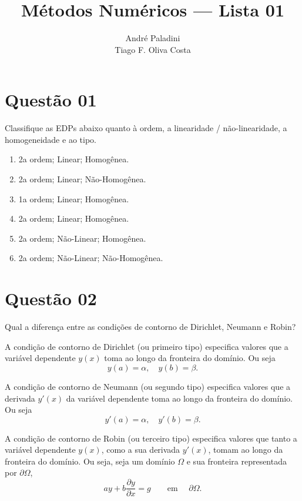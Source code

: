 \documentclass{article}
\title{Métodos Numéricos --- Lista 01}
\author{André Paladini  \quad 14182390 \\ Tiago F. Oliva Costa \quad 8004408 }
\begin{document}
\maketitle

\section{Questão 01}
Classifique as EDPs abaixo quanto à ordem, a linearidade / não-linearidade, a homogeneidade e ao tipo.

\begin{enumerate}[label=\Alph*]
\item 2a ordem; Linear; Homogênea.
\item 2a ordem; Linear; Não-Homogênea.
\item 1a ordem; Linear; Homogênea.
\item 2a ordem; Linear; Homogênea.
\item 2a ordem; Não-Linear; Homogênea.
\item 2a ordem; Não-Linear; Não-Homogênea.
\end{enumerate}

\section{Questão 02}
Qual a diferença entre as condições de contorno de Dirichlet, Neumann e Robin?

A condição de contorno de Dirichlet (ou primeiro tipo) especifica valores que a variável dependente $y(x)$ toma ao longo da fronteira do domínio. Ou seja
\[ y(a) = \alpha, \quad y(b) = \beta. \]

A condição de contorno de Neumann (ou segundo tipo) especifica valores que a derivada $y'(x)$ da variável dependente  toma ao longo da fronteira do domínio. Ou seja
\[ y'(a) = \alpha, \quad y'(b) = \beta. \]

A condição de contorno de Robin (ou terceiro tipo) especifica valores que tanto a variável dependente $y(x)$, como a sua derivada $y'(x)$, tomam ao longo da fronteira do domínio. Ou seja, seja um domínio $\Omega$ e sua fronteira representada por $\partial \Omega$,
\[ a y + b \frac{\partial y}{\partial x} =g \qquad \text{em } \quad \partial \Omega.\]
\end{document}

